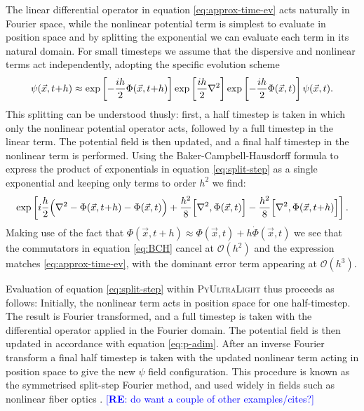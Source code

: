 \documentclass[a4paper,11pt]{article}
\newcommand{\PyUltraLight}{\textsc{PyUltraLight}\xspace}
\newcommand{\re}[1]{\textcolor{blue}{[{\bf RE}: #1]}}
\begin{document}
The linear differential operator in equation \ref{eq:approx-time-ev} acts naturally in Fourier space, while the nonlinear potential term is simplest to evaluate in position space and by splitting the exponential we can evaluate each term in its natural domain.  For small timesteps we assume that the dispersive and nonlinear terms act independently,  adopting the specific evolution scheme  
%
\begin{equation}\label{eq:split-step}
    \psi(\vec{x},t\hspace*{-.2em}+\hspace*{-.2em}h)\approx\operatorname{exp}\left[-\frac{ih}{2}\Phi(\vec{x},t\hspace*{-.2em}+\hspace*{-.2em}h)\right]\operatorname{exp}\left[\frac{ih}{2}\nabla^2\right]\operatorname{exp}\left[-\frac{ih}{2}\Phi(\vec{x},t)\right]\psi(\vec{x},t).
\end{equation}
%
This splitting can be understood thusly: first, a half timestep is taken in which only the nonlinear potential operator acts, followed by a full timestep in the linear term. The potential field is then updated, and a final half timestep in the nonlinear term is performed. Using the Baker-Campbell-Hausdorff formula to express the product of exponentials in equation \ref{eq:split-step} as a single exponential and keeping only terms to order $h^2$ we find:
\begin{equation}\label{eq:BCH}
    \operatorname{exp}\left[i\frac{h}{2}\Big(\nabla^2-\Phi(\vec{x},t\hspace*{-.2em}+\hspace*{-.2em}h)-\Phi(\vec{x},t)\Big)+\frac{h^2}{8}\Big[\nabla^2,\Phi(\vec{x},t)\Big]-\frac{h^2}{8}\Big[\nabla^2,\Phi(\vec{x},t\hspace*{-.2em}+\hspace*{-.2em}h)\Big]\right].
\end{equation}
Making use of the fact that $\Phi(\vec{x},t+h)\approx\Phi(\vec{x},t)+h\Dot{\Phi}(\vec{x},t)$ we see that the commutators in equation \ref{eq:BCH} cancel at $\mathcal{O}(h^2)$ and the expression matches \ref{eq:approx-time-ev}, with the dominant error term appearing at $\mathcal{O}(h^3)$. 

Evaluation of equation \ref{eq:split-step} within \PyUltraLight thus proceeds as follows:
Initially, the nonlinear term acts in position space for one half-timestep. The result is  Fourier transformed, and a full timestep is taken with the differential operator  applied in the Fourier domain. The potential field is then updated in accordance with equation \ref{eq:p-adim}. After an inverse Fourier transform a final half timestep is taken with the updated nonlinear term acting in position space to give the new $\psi$ field configuration. This procedure is known as the symmetrised split-step Fourier method, and  used widely in fields such as nonlinear fiber optics \cite{Agrawal2013}. \re{do want a couple of other examples/cites?} 
\end{document}
